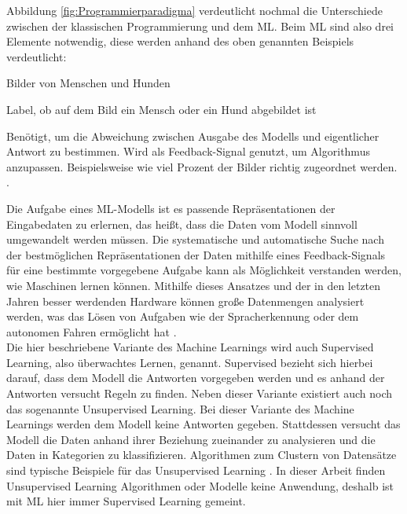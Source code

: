 Abbildung \ref*{fig:Programmierparadigma} verdeutlicht nochmal die Unterschiede zwischen der klassischen Programmierung und dem \ac{ML}. Beim \ac{ML} sind also drei Elemente
notwendig, diese werden anhand des oben genannten Beispiels verdeutlicht: 

\begin{description}[style=multiline,leftmargin=3cm,font=\bfseries]
    \item[Eingabedaten] Bilder von Menschen und Hunden \cite[S.24]{DL_PY}
    \item[Antworten] Label, ob auf dem Bild ein Mensch oder ein Hund abgebildet ist \cite[S.24]{DL_PY}
    \item[Metrik zur Bewertung des Algorithmus] Benötigt, um die Abweichung zwischen Ausgabe des Modells und eigentlicher Antwort zu bestimmen. Wird als Feedback-Signal genutzt,
    um Algorithmus anzupassen. Beispielsweise wie viel Prozent der Bilder richtig zugeordnet werden. \cite[S.24f.]{DL_PY}.  
\end{description}

Die Aufgabe eines \ac{ML}-Modells ist es passende Repräsentationen der Eingabedaten zu erlernen, das heißt, dass die Daten vom Modell sinnvoll umgewandelt werden müssen. 
Die systematische und automatische Suche nach der bestmöglichen Repräsentationen der Daten mithilfe eines Feedback-Signals für eine bestimmte vorgegebene Aufgabe kann als Möglichkeit 
verstanden werden, wie Maschinen lernen können. Mithilfe dieses Ansatzes und der in den letzten Jahren besser werdenden Hardware können große Datenmengen analysiert werden, was das Lösen von 
Aufgaben wie der Spracherkennung oder dem autonomen Fahren ermöglicht hat \cite[vgl. S.24ff.]{DL_PY}.\\

Die hier beschriebene Variante des Machine Learnings wird auch Supervised Learning, also überwachtes Lernen, genannt. \glqq Supervised\grqq{} bezieht sich hierbei darauf, dass
dem Modell die Antworten vorgegeben werden und es anhand der Antworten versucht Regeln zu finden. Neben dieser Variante existiert auch noch das sogenannte
Unsupervised Learning. Bei dieser Variante des Machine Learnings werden dem Modell keine Antworten gegeben. Stattdessen versucht das Modell die Daten anhand ihrer
Beziehung zueinander zu analysieren und die Daten in Kategorien zu klassifizieren. Algorithmen zum Clustern von Datensätze sind typische Beispiele für das Unsupervised Learning
\cite[vgl. S.47ff.]{AI_Huawei}. In dieser Arbeit finden Unsupervised Learning Algorithmen oder Modelle keine Anwendung, deshalb ist mit \ac{ML} hier immer Supervised Learning gemeint.


